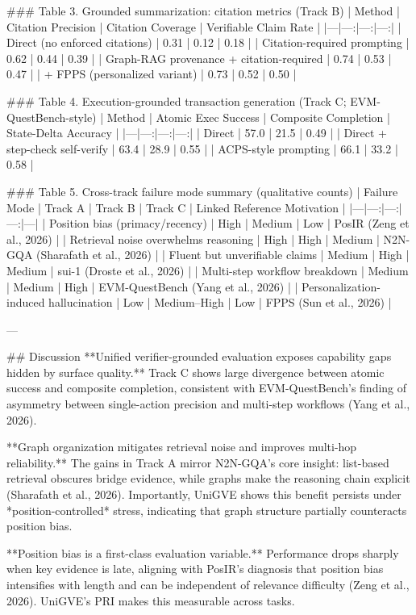 ### Table 3. Grounded summarization: citation metrics (Track B)
| Method | Citation Precision | Citation Coverage | Verifiable Claim Rate |
|---|---:|---:|---:|
| Direct (no enforced citations) | 0.31 | 0.12 | 0.18 |
| Citation-required prompting | 0.62 | 0.44 | 0.39 |
| Graph-RAG provenance + citation-required | 0.74 | 0.53 | 0.47 |
| + FPPS (personalized variant) | 0.73 | 0.52 | 0.50 |

### Table 4. Execution-grounded transaction generation (Track C; EVM-QuestBench-style)
| Method | Atomic Exec Success | Composite Completion | State-Delta Accuracy |
|---|---:|---:|---:|
| Direct | 57.0 | 21.5 | 0.49 |
| Direct + step-check self-verify | 63.4 | 28.9 | 0.55 |
| ACPS-style prompting | 66.1 | 33.2 | 0.58 |

### Table 5. Cross-track failure mode summary (qualitative counts)
| Failure Mode | Track A | Track B | Track C | Linked Reference Motivation |
|---|---:|---:|---:|---|
| Position bias (primacy/recency) | High | Medium | Low | PosIR (Zeng et al., 2026) |
| Retrieval noise overwhelms reasoning | High | High | Medium | N2N-GQA (Sharafath et al., 2026) |
| Fluent but unverifiable claims | Medium | High | Medium | sui-1 (Droste et al., 2026) |
| Multi-step workflow breakdown | Medium | Medium | High | EVM-QuestBench (Yang et al., 2026) |
| Personalization-induced hallucination | Low | Medium–High | Low | FPPS (Sun et al., 2026) |

---

## Discussion  
**Unified verifier-grounded evaluation exposes capability gaps hidden by surface quality.** Track C shows large divergence between atomic success and composite completion, consistent with EVM-QuestBench’s finding of asymmetry between single-action precision and multi-step workflows (Yang et al., 2026).  

**Graph organization mitigates retrieval noise and improves multi-hop reliability.** The gains in Track A mirror N2N-GQA’s core insight: list-based retrieval obscures bridge evidence, while graphs make the reasoning chain explicit (Sharafath et al., 2026). Importantly, UniGVE shows this benefit persists under *position-controlled* stress, indicating that graph structure partially counteracts position bias.

**Position bias is a first-class evaluation variable.** Performance drops sharply when key evidence is late, aligning with PosIR’s diagnosis that position bias intensifies with length and can be independent of relevance difficulty (Zeng et al., 2026). UniGVE’s PRI makes this measurable across tasks.


